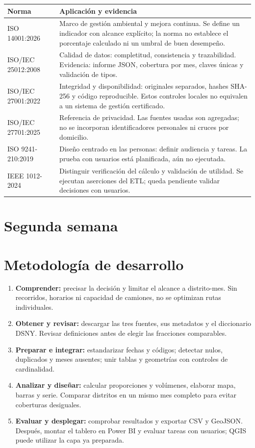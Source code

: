 \documentclass[10pt,a4paper]{article}
\begin{document}
\begin{center}\small
\begin{tabularx}{\linewidth}{@{}p{4.0cm}Y@{}}
\toprule
\textbf{Norma} & \textbf{Aplicación y evidencia} \\\midrule
ISO 14001:2026~\cite{ambiental} & Marco de gestión ambiental y mejora continua. Se define un indicador con alcance explícito; la norma no establece el porcentaje calculado ni un umbral de buen desempeño. \\
ISO/IEC 25012:2008~\cite{calidad} & Calidad de datos: completitud, consistencia y trazabilidad. Evidencia: informe JSON, cobertura por mes, claves únicas y validación de tipos. \\
ISO/IEC 27001:2022~\cite{seguridad} & Integridad y disponibilidad: originales separados, hashes SHA-256 y código reproducible. Estos controles locales no equivalen a un sistema de gestión certificado. \\
ISO/IEC 27701:2025~\cite{privacidad} & Referencia de privacidad. Las fuentes usadas son agregadas; no se incorporan identificadores personales ni cruces por domicilio. \\
ISO 9241-210:2019~\cite{usuario} & Diseño centrado en las personas: definir audiencia y tareas. La prueba con usuarios está planificada, aún no ejecutada. \\
IEEE 1012-2024~\cite{ieee} & Distinguir verificación del cálculo y validación de utilidad. Se ejecutan aserciones del ETL; queda pendiente validar decisiones con usuarios. \\
\bottomrule
\end{tabularx}\end{center}

\section*{Segunda semana}
\section{Metodología de desarrollo}
\begin{enumerate}
\item \textbf{Comprender:} precisar la decisión y limitar el alcance a distrito-mes. Sin recorridos, horarios ni capacidad de camiones, no se optimizan rutas individuales.
\item \textbf{Obtener y revisar:} descargar las tres fuentes, sus metadatos y el diccionario DSNY. Revisar definiciones antes de elegir las fracciones comparables.
\item \textbf{Preparar e integrar:} estandarizar fechas y códigos; detectar nulos, duplicados y meses ausentes; unir tablas y geometrías con controles de cardinalidad.
\item \textbf{Analizar y diseñar:} calcular proporciones y volúmenes, elaborar mapa, barras y serie. Comparar distritos en un mismo mes completo para evitar coberturas desiguales.
\item \textbf{Evaluar y desplegar:} comprobar resultados y exportar CSV y GeoJSON. Después, montar el tablero en Power BI y evaluar tareas con usuarios; QGIS puede utilizar la capa ya preparada.
\end{enumerate}
\end{document}
